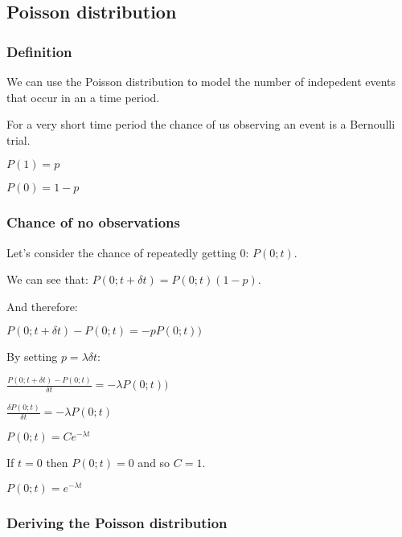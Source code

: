 
\subsection{Poisson distribution}

\subsubsection{Definition}

We can use the Poisson distribution to model the number of indepedent events that occur in an a time period.

For a very short time period the chance of us observing an event is a Bernoulli trial.

\(P(1)=p\)

\(P(0)=1-p\)

\subsubsection{Chance of no observations}

Let's consider the chance of repeatedly getting \(0\): \(P(0;t)\).

We can see that: \(P(0;t+\delta t)=P(0;t)(1-p)\).

And therefore:

\(P(0;t+\delta t)-P(0;t)=-pP(0;t))\)

By setting \(p=\lambda \delta t\):

\(\frac{P(0;t+\delta t)-P(0;t)}{\delta t}=-\lambda P(0;t))\)

\(\frac{\delta P(0;t)}{\delta t}=-\lambda P(0;t)\)

\(P(0;t)=Ce^{-\lambda t}\)

If \(t=0\) then \(P(0;t)=0\) and so \(C=1\).

\(P(0;t)=e^{-\lambda t}\)

\subsubsection{Deriving the Poisson distribution}


